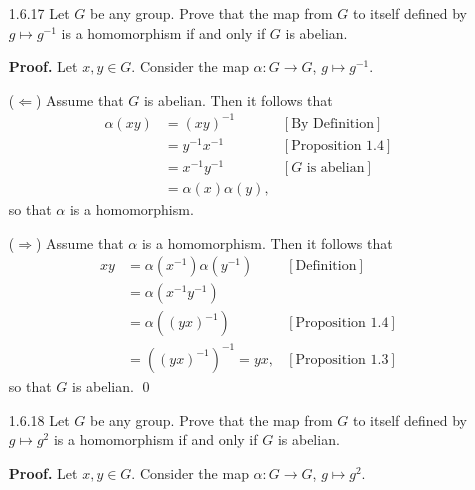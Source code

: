 \begin{enumerate}
      \textbf{Proof.} Let $(a, b), (c, d) \in G$. Then it follows immediately 
      that $\pi_1$ and $\pi_2$ are homomorphisms since
      $$\pi_1((a, b)(c, d)) = \pi_1(ac, bd) = ac = \pi_1(a, b)\pi_1(c, d)$$
      and
      $$\pi_2((a, b)(c, d)) = \pi_2(ac, bd) = bd = \pi_2(a, b)\pi_2(c, d).$$
      The kernel of $\pi_1 = \{(1, b) : b \in B\}$ and
      the kernel of $\pi_2 = \{(a, 1) : a \in A\}$. \qed
   \item[1.6.17]  Let $G$ be any group. Prove that the map from $G$ to itself
                  defined by $g \mapsto g^{-1}$ is a homomorphism if and only if
                  $G$ is abelian.

      \textbf{Proof.} Let $x, y \in G$. Consider the map
      $\alpha : G \rightarrow G$, $g \mapsto g^{-1}$. 

      ($\Leftarrow$) Assume that $G$ is abelian. Then it
      follows that
      \begin{align*}
         \alpha(xy) &= (xy)^{-1} &[\text{By Definition}] \\
            &= y^{-1}x^{-1} &[\text{Proposition 1.4}] \\
            &= x^{-1}y^{-1} &[G \text{ is abelian}] \\
            &= \alpha(x)\alpha(y),
      \end{align*}
      so that $\alpha$ is a homomorphism.

      ($\Rightarrow$) Assume that $\alpha$ is a homomorphism. Then it
      follows that
      \begin{align*}
         xy &= \alpha(x^{-1})\alpha(y^{-1}) &[\text{Definition}] \\
            &= \alpha(x^{-1}y^{-1}) \\
            &= \alpha((yx)^{-1}) &[\text{Proposition 1.4}] \\
            &= ((yx)^{-1})^{-1} = yx, &[\text{Proposition 1.3}]
      \end{align*}
      so that $G$ is abelian. \qed
   \item[1.6.18]  Let $G$ be any group. Prove that the map from $G$ to itself
                  defined by $g \mapsto g^2$ is a homomorphism if and only if
                  $G$ is abelian.

      \textbf{Proof.} Let $x, y \in G$. Consider the map
      $\alpha : G \rightarrow G$, $g \mapsto g^2$. 


\end{enumerate}
